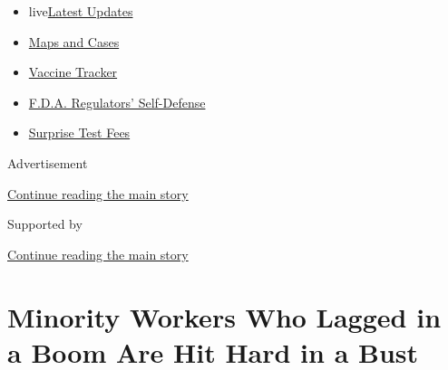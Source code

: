 \begin{itemize}
\tightlist
\item
  live\href{https://www.nytimes3xbfgragh.onion/2020/09/11/world/covid-19-coronavirus.html?name=styln-coronavirus-markets\&region=TOP_BANNER\&block=storyline_menu_recirc\&action=click\&pgtype=Article\&impression_id=16738ce0-f4b9-11ea-8ebe-179a99a195cb\&variant=undefined}{Latest
  Updates}
\item
  \href{https://www.nytimes3xbfgragh.onion/interactive/2020/us/coronavirus-us-cases.html?name=styln-coronavirus-markets\&region=TOP_BANNER\&block=storyline_menu_recirc\&action=click\&pgtype=Article\&impression_id=16738ce1-f4b9-11ea-8ebe-179a99a195cb\&variant=undefined}{Maps
  and Cases}
\item
  \href{https://www.nytimes3xbfgragh.onion/interactive/2020/science/coronavirus-vaccine-tracker.html?name=styln-coronavirus-markets\&region=TOP_BANNER\&block=storyline_menu_recirc\&action=click\&pgtype=Article\&impression_id=16738ce2-f4b9-11ea-8ebe-179a99a195cb\&variant=undefined}{Vaccine
  Tracker}
\item
  \href{https://www.nytimes3xbfgragh.onion/2020/09/10/us/politics/fda-coronavirus-vaccine.html?name=styln-coronavirus-markets\&region=TOP_BANNER\&block=storyline_menu_recirc\&action=click\&pgtype=Article\&impression_id=16738ce3-f4b9-11ea-8ebe-179a99a195cb\&variant=undefined}{F.D.A.
  Regulators' Self-Defense}
\item
  \href{https://www.nytimes3xbfgragh.onion/2020/09/09/upshot/coronavirus-surprise-test-fees.html?name=styln-coronavirus-markets\&region=TOP_BANNER\&block=storyline_menu_recirc\&action=click\&pgtype=Article\&impression_id=16738ce4-f4b9-11ea-8ebe-179a99a195cb\&variant=undefined}{Surprise
  Test Fees}
\end{itemize}

Advertisement

\protect\hyperlink{after-top}{Continue reading the main story}

Supported by

\protect\hyperlink{after-sponsor}{Continue reading the main story}

\hypertarget{minority-workers-who-lagged-in-a-boom-are-hit-hard-in-a-bust}{%
\section{Minority Workers Who Lagged in a Boom Are Hit Hard in a
Bust}\label{minority-workers-who-lagged-in-a-boom-are-hit-hard-in-a-bust}}

